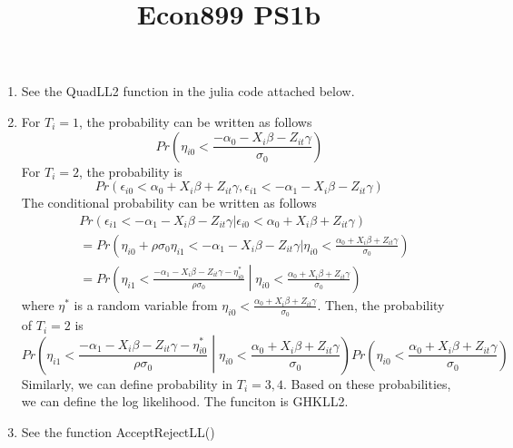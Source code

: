 \documentclass[landscape]{article} %
\title{Econ899 PS1b}
\theoremstyle{definition}
\begin{document}
\begin{enumerate}
\item See the QuadLL2 function in the julia code attached below.
\item For $T_i = 1$, the probability can be written as follows
  \begin{equation}
    \label{eq:1}
    Pr\left(\eta_{i0} < \frac{-\alpha_0 - X_i\beta - Z_{it}\gamma}{\sigma_0}\right)
  \end{equation}
  For $T_i = 2$, the probability is
  \begin{equation}
    \label{eq:2}
    Pr\left(\epsilon_{i0} < \alpha_0 + X_i\beta + Z_{it}\gamma, \epsilon_{i1} < - \alpha_1 - X_i\beta - Z_{it}\gamma \right)
  \end{equation}
  The conditional probability can be written as follows
  \begin{align*}
    & Pr\left(\epsilon_{i1} < - \alpha_1 - X_i\beta - Z_{it}\gamma |\epsilon_{i0} < \alpha_0 + X_i\beta + Z_{it}\gamma \right) \\  
    & = Pr\left(\eta_{i0} + \rho \sigma_0 \eta_{i1} < - \alpha_1 - X_i\beta - Z_{it}\gamma |\eta_{i0} < \frac{\alpha_0 + X_i\beta + Z_{it}\gamma}{\sigma_0} \right)\\
    & = Pr\left(\eta_{i1} < \frac{- \alpha_1 - X_i\beta - Z_{it}\gamma-\eta^*_{i0}}{\rho \sigma_0} \middle|\eta_{i0} < \frac{\alpha_0 + X_i\beta + Z_{it}\gamma}{\sigma_0} \right)
  \end{align*}
  where $\eta^*$ is a random variable from  $\eta_{i0} < \frac{\alpha_0 + X_i\beta + Z_{it}\gamma}{\sigma_0}$. Then, the probability of $T_i= 2$ is 
  \begin{equation}
    \label{eq:3}
    Pr\left(\eta_{i1} < \frac{- \alpha_1 - X_i\beta - Z_{it}\gamma-\eta^*_{i0}}{\rho \sigma_0} \middle|\eta_{i0} < \frac{\alpha_0 + X_i\beta + Z_{it}\gamma}{\sigma_0} \right) Pr\left(\eta_{i0} < \frac{\alpha_0 + X_i\beta + Z_{it}\gamma}{\sigma_0} \right) 
  \end{equation}
  Similarly, we can define probability in $T_i = 3,4$. Based on these probabilities, we can define the log likelihood. The funciton is GHKLL2. 

\item See the function AcceptRejectLL()


\end{enumerate}
\end{document}
